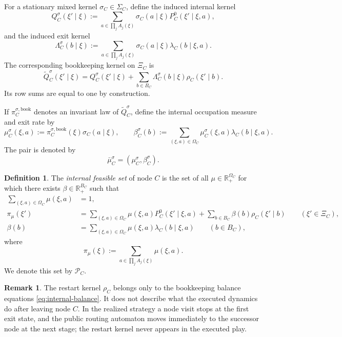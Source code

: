 \documentclass[12pt]{article}
\theoremstyle{definition}
\newtheorem{definition}[theorem]{Definition}
\newtheorem{remark}[theorem]{Remark}
\newcommand{\R}{\mathbb{R}}
\newcommand{\1}{\mathbf{1}}
\newcommand{\cP}{\mathcal{P}}
\begin{document}
For a stationary mixed kernel $\sigma_C\in\Sigma_C$, define the induced internal
kernel
\[
Q_C^{\sigma}(\xi'\mid \xi)
:=
\sum_{a\in\prod_j A_j(\xi)} \sigma_C(a\mid \xi)
P_C^0(\xi'\mid \xi,a),
\]
and the induced exit kernel
\[
\Lambda_C^{\sigma}(b\mid\xi)
:=
\sum_{a\in\prod_j A_j(\xi)}\sigma_C(a\mid\xi)\lambda_C(b\mid\xi,a).
\]
The corresponding bookkeeping kernel on $\Xi_C$ is
\begin{equation}
\label{eq:bookkeeping-kernel}
\widetilde Q_C^{\sigma}(\xi'\mid \xi)
=
Q_C^{\sigma}(\xi'\mid \xi)
+
\sum_{b\in B_C}\Lambda_C^{\sigma}(b\mid \xi)\rho_C(\xi'\mid b).
\end{equation}
Its row sums are equal to one by construction.

If $\pi_C^{\sigma,\mathrm{book}}$ denotes an invariant law of
$\widetilde Q_C^{\sigma}$, define the internal occupation measure and exit rate by
\[
\mu_C^{\sigma}(\xi,a):=\pi_C^{\sigma,\mathrm{book}}(\xi)\sigma_C(a\mid\xi),
\qquad
\beta_C^{\sigma}(b):=\sum_{(\xi,a)\in\Omega_C}
\mu_C^{\sigma}(\xi,a)\lambda_C(b\mid\xi,a).
\]
The pair is denoted by
\[
\bar\mu_C^{\sigma}=(\mu_C^{\sigma},\beta_C^{\sigma}).
\]


\begin{definition}
\label{def:PC}
The \emph{internal feasible set} of node $C$ is the set of all
$\mu\in\R_+^{\Omega_C}$ for which there exists $\beta\in\R_+^{B_C}$ such that
\begin{align}
\sum_{(\xi,a)\in\Omega_C}\mu(\xi,a)&=1,
\label{eq:norm-PC}
\\
\pi_\mu(\xi')
&=
\sum_{(\xi,a)\in\Omega_C}\mu(\xi,a)P_C^0(\xi'\mid\xi,a)
+
\sum_{b\in B_C}\beta(b)\rho_C(\xi'\mid b)
\qquad (\xi'\in\Xi_C),
\label{eq:internal-balance}
\\
\beta(b)
&=
\sum_{(\xi,a)\in\Omega_C}\mu(\xi,a)\lambda_C(b\mid\xi,a)
\qquad (b\in B_C),
\label{eq:beta-balance}
\end{align}
where
\[
\pi_\mu(\xi):=\sum_{a\in\prod_j A_j(\xi)}\mu(\xi,a).
\]
We denote this set by $\cP_C$.
\end{definition}


\begin{remark}
The restart kernel $\rho_C$ belongs only to the bookkeeping balance equations
\eqref{eq:internal-balance}. It does not describe what the executed dynamics do
after leaving node $C$. In the realized strategy a node visit stops at the first
exit state, and the public routing automaton moves immediately to the successor
node at the next stage; the restart kernel never appears in the executed play.
\end{remark}
\end{document}
